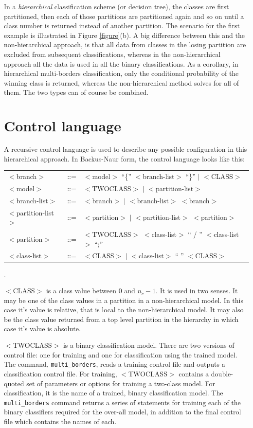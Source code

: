 In a {\it hierarchical} classification scheme (or decision tree), the classes are first partitioned, then
each of those partitions are partitioned again and so on 
until a class number is returned instead of another partition.
The scenario for the first example is illustrated in Figure \ref{figure}(b).
A big difference between this and the non-hierarchical approach, is that all
data from classes in the losing partition are excluded from subsequent
classifications, whereas in the non-hierarchical approach all the data is
used in all the binary classifications.
As a corollary, in hierarchical multi-borders classification, 
only the conditional probability of the winning class is returned, 
whereas the non-hierarchical method solves for all of them.
The two types can of course be combined.

\section{Control language}

A recursive control language is used to describe any possible configuration in this hierarchical approach.  In Backus-Naur
form, the control language looks like this:

\begin{tabular}{lcl}
$<$branch$>$ & ::= & $<$model$>$ ``\{'' $<$branch-list$>$ ``\}'' $|$ $<$CLASS$>$\\
$<$model$>$  & ::= & $<$TWOCLASS$>$ $|$ $<$partition-list$>$\\
$<$branch-list$>$ & ::= & $<$branch$>$ $|$ $<$branch-list$>$ $<$branch$>$\\
$<$partition-list$>$ & ::= & $<$partition$>$ $|$ $<$partition-list$>$ $<$partition$>$\\
$<$partition$>$ & ::= & $<$TWOCLASS$>$ $<$class-list$>$ `` / '' $<$class-list$>$ ``;''\\
$<$class-list$>$ & ::= & $<$CLASS$>$ $|$ $<$class-list$>$ `` '' $<$CLASS$>$
\end{tabular}.

$<$CLASS$>$ is a class value between 0 and $n_c-1$.  It is used in two senses.
It may be one of the class values in a partition in a non-hierarchical model.
In this case it's value is relative, that is local to the non-hierarchical model.
It may also be the class value returned
from a top level partition in the hierarchy in which case it's value is absolute.

$<$TWOCLASS$>$ is a binary classification model.
There are two versions of control file: one for training and one for
classification using the trained model.  The command, \verb/multi_borders/,
reads a training control file and outputs a classification control file.
For training, $<$TWOCLASS$>$ contains a double-quoted set of parameters
or options for training a two-class model.  For classification, it 
is the name of a trained, binary classification model.
The \verb/multi_borders/ command returns a series of statements for training
each of the binary classifiers required for the over-all model, in addition
to the final control file which contains the names of each.

